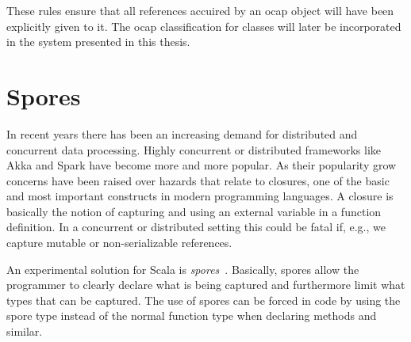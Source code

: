 These rules ensure that all references accuired by an ocap object will have been
explicitly given to it. The ocap classification for classes will later be
incorporated in the system presented in this thesis.


\section{Spores}\label{sec:spores}

In recent years there has been an increasing demand for distributed and
concurrent data processing. Highly concurrent or distributed frameworks like
Akka and Spark have become more and more popular. As their popularity grow
concerns have been raised over hazards that relate to closures, one of the basic
and most important constructs in modern programming languages. A closure is
basically the notion of capturing and using an external variable in a function
definition. In a concurrent or distributed setting this could be fatal if, e.g.,
we capture mutable or non-serializable references. 

An experimental solution for Scala is
\emph{spores}~\parencite{conf/ecoop/MillerHO14}. Basically, spores allow the
programmer to clearly declare what is being captured and furthermore limit what
types that can be captured. The use of spores can be forced in code by using the
spore type instead of the normal function type when declaring methods and
similar.




